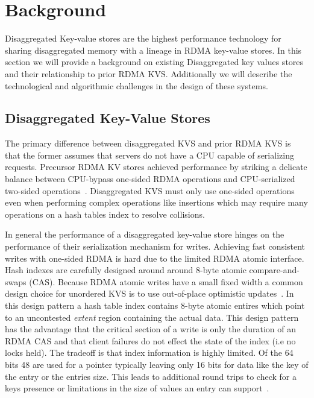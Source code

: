 
\section{Background}
\label{sec:background}

Disaggregated Key-value stores are the highest performance technology for sharing disaggregated
memory with a lineage in RDMA key-value stores. In this section we will provide a background on
existing Disaggregated key values stores and their relationship to prior RDMA KVS. Additionally we
will describe the technological and algorithmic challenges in the design of these systems.



\subsection{Disaggregated Key-Value Stores}

The primary difference between disaggregated KVS and prior RDMA KVS is that the former assumes that
servers do not have a CPU capable of serializing requests. Precursor RDMA KV stores achieved
performance by striking a delicate balance between CPU-bypass one-sided RDMA operations and
CPU-serialized two-sided operations~\cite{farm,herd,pilaf,cell,storm}. Disaggregated KVS must only
use one-sided operations even when performing complex operations like insertions which may require
many operations on a hash tables index to resolve collisions.

In general the performance of a disaggregated key-value store hinges on the performance of their
serialization mechanism for writes. Achieving fast consistent writes with one-sided RDMA is hard due
to the limited RDMA atomic interface. Hash indexes are carefully designed around around 8-byte
atomic compare-and-swaps (CAS). Because RDMA atomic writes have a small fixed width a common design
choice for unordered KVS is to use out-of-place optimistic updates~\cite{race,fusee,ditto}. In this
design pattern a hash table index contains 8-byte atomic entires which point to an uncontested
\textit{extent} region containing the actual data. This design pattern has the advantage that the
critical section of a write is only the duration of an RDMA CAS and that client failures do not
effect the state of the index (i.e no locks held). The tradeoff is that index information is highly
limited. Of the 64 bits 48 are used for a pointer typically leaving only 16 bits for data like the
key of the entry or the entries size. This leads to additional round trips to check for a keys
presence or limitations in the size of values an entry can support~\cite{race,fusee}.

